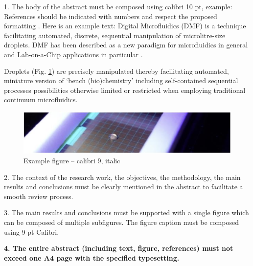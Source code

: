 \documentclass[british]{article}
\begin{document}




1. The body of the abstract must be composed using calibri 10 pt, example: References should be indicated with numbers and respect the proposed formatting \cite{article1}. Here is an example text: Digital Microfluidics (DMF) \cite{article2} is a technique facilitating automated, discrete, sequential manipulation of microlitre-size droplets. DMF has been described as a new paradigm for microfluidics in general and Lab-on-a-Chip applications in particular \cite{article3}.

Droplets (Fig. \ref{fig:main_figure}) are precisely manipulated thereby facilitating automated, miniature version of ‘bench (bio)chemistry’ including self-contained sequential processes possibilities otherwise limited or restricted when employing traditional continuum microfluidics.

\begin{figure}[h!]
\centering
  \includegraphics[width=\linewidth]{main_figure.png}
  \caption{
    Example figure – calibri 9, italic
  }
\label{fig:main_figure}
\end{figure}

2. The context of the research work, the objectives, the methodology, the main results and conclusions must be clearly mentioned in the abstract to facilitate a smooth review process.

3. The main results and conclusions must be supported with a single figure which can be composed of multiple subfigures. The figure caption must be composed using {\small 9 pt Calibri}.

\textbf{4. The entire abstract (including text, figure, references) must not exceed one A4 page with the specified typesetting.}
\end{document}
